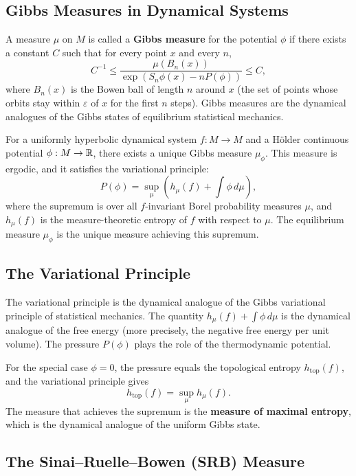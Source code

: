 \subsection{Gibbs Measures in Dynamical Systems}

A measure \(\mu\) on \(M\) is called a \textbf{Gibbs measure} for the potential \(\phi\) if there exists a constant \(C\) such that for every point \(x\) and every \(n\),
\[
C^{-1} \le \frac{\mu(B_n(x))}{\exp(S_n \phi(x) - n P(\phi))} \le C,
\]
where \(B_n(x)\) is the Bowen ball of length \(n\) around \(x\) (the set of points whose orbits stay within \(\varepsilon\) of \(x\) for the first \(n\) steps). Gibbs measures are the dynamical analogues of the Gibbs states of equilibrium statistical mechanics.

\begin{theorem}
For a uniformly hyperbolic dynamical system \(f: M \to M\) and a H\"older continuous potential \(\phi: M \to \mathbb{R}\), there exists a unique Gibbs measure \(\mu_\phi\). This measure is ergodic, and it satisfies the variational principle:
\[
P(\phi) = \sup_\mu \left( h_\mu(f) + \int \phi\, d\mu \right),
\]
where the supremum is over all \(f\)-invariant Borel probability measures \(\mu\), and \(h_\mu(f)\) is the measure-theoretic entropy of \(f\) with respect to \(\mu\). The equilibrium measure \(\mu_\phi\) is the unique measure achieving this supremum.
\end{theorem}

\subsection{The Variational Principle}

The variational principle is the dynamical analogue of the Gibbs variational principle of statistical mechanics. The quantity \(h_\mu(f) + \int \phi\, d\mu\) is the dynamical analogue of the free energy (more precisely, the negative free energy per unit volume). The pressure \(P(\phi)\) plays the role of the thermodynamic potential.

For the special case \(\phi = 0\), the pressure equals the topological entropy \(h_{\text{top}}(f)\), and the variational principle gives
\[
h_{\text{top}}(f) = \sup_\mu h_\mu(f).
\]
The measure that achieves the supremum is the \textbf{measure of maximal entropy}, which is the dynamical analogue of the uniform Gibbs state.

\subsection{The Sinai--Ruelle--Bowen (SRB) Measure}

